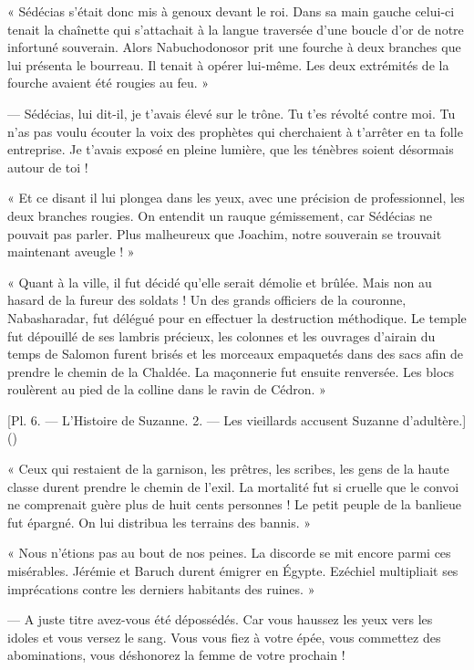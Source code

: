 \documentclass[a4paper, 11pt, oneside, polutonikogreek, french]{article}
\begin{document}
« Sédécias s'était donc mis à genoux devant le roi. Dans sa main gauche celui-ci tenait la chaînette qui s'attachait à la langue traversée d'une boucle d'or de notre infortuné souverain. Alors Nabuchodonosor prit une fourche à deux branches que lui présenta le bourreau. Il tenait à opérer lui-même. Les deux extrémités de la fourche avaient été rougies au feu. »

--- Sédécias, lui dit-il, je t'avais élevé sur le trône. Tu t'es révolté contre moi. Tu n'as pas voulu écouter la voix des prophètes qui cherchaient à t'arrêter en ta folle entreprise. Je t'avais exposé en pleine lumière, que les ténèbres soient désormais autour de toi !

« Et ce disant il lui plongea dans les yeux, avec une précision de professionnel, les deux branches rougies. On entendit un rauque gémissement, car Sédécias ne pouvait pas parler. Plus malheureux que Joachim, notre souverain se trouvait maintenant aveugle ! »

\bigskip
\centerline{\EightStarTaper}
\centerline{\EightStarTaper\EightStarTaper}
\bigskip

« Quant à la ville, il fut décidé qu'elle serait démolie et brûlée. Mais non au hasard de la fureur des soldats ! Un des grands officiers de la couronne, Nabasharadar, fut délégué pour en effectuer la destruction méthodique. Le temple fut dépouillé de ses lambris précieux, les colonnes et les ouvrages d'airain du temps de Salomon furent brisés et les morceaux empaquetés dans des sacs afin de prendre le chemin de la Chaldée. La maçonnerie fut ensuite renversée. Les blocs roulèrent au pied de la colline dans le ravin de Cédron. »

[Pl. 6. --- L'Histoire de Suzanne. 2. --- Les vieillards accusent Suzanne d'adultère.]()

« Ceux qui restaient de la garnison, les prêtres, les scribes, les gens de la haute classe durent prendre le chemin de l'exil. La mortalité fut si cruelle que le convoi ne comprenait guère plus de huit cents personnes ! Le petit peuple de la banlieue fut épargné. On lui distribua les terrains des bannis. »

\bigskip
\centerline{\EightStarTaper}
\centerline{\EightStarTaper\EightStarTaper}
\bigskip

« Nous n'étions pas au bout de nos peines. La discorde se mit encore parmi ces misérables. Jérémie et Baruch durent émigrer en Égypte. Ezéchiel multipliait ses imprécations contre les derniers habitants des ruines. »

--- A juste titre avez-vous été dépossédés. Car vous haussez les yeux vers les idoles et vous versez le sang. Vous vous fiez à votre épée, vous commettez des abominations, vous déshonorez la femme de votre prochain !
\end{document}

